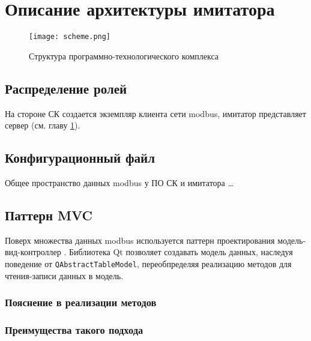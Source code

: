 \chapter{Описание архитектуры имитатора}\label{ch:ch2}

\begin{center}
    \begin{figure}[hb]
        \texttt{[image: scheme.png]}
        \caption{Структура программно-технологического комплекса}\label{fig:asc_schema}
    \end{figure}
\end{center}
    


\section{Распределение ролей}

На стороне СК создается экземпляр клиента сети modbus,
имитатор представляет сервер (см. главу \ref{ch:ch2}).





\section{Конфигурационный файл}\label{sec:ch2/sec1}

Общее пространство данных modbus у ПО СК и имитатора \ldots






\section{Паттерн MVC}

Поверх множества данных modbus используется паттерн проектирования модель-вид-контроллер \cite{book:pattern:band_of_4}.
Библиотека Qt позволяет создавать модель данных, наследуя поведение от \lstinline[language=C]!QAbstractTableModel!,
переобпределяя реализацию методов для чтения-записи данных в модель.

\subsection{Пояснение в реализации методов}

\subsection{Преимущества такого подхода}



